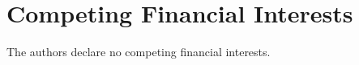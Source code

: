\documentclass[journal, onecolumn]{IEEEtran}
\begin{document}
\section*{\large\bf{Competing Financial Interests}}
The authors declare no competing financial interests.
   








%
%
%
\end{document}
